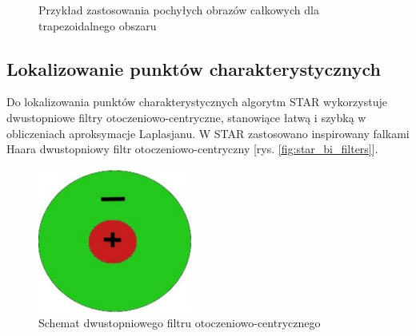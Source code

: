 \begin{figure}
\centering
{}
\caption{Przykład zastosowania pochyłych obrazów całkowych dla trapezoidalnego obszaru}
\label{fig:cs_trapezoidal}
\end{figure}







\subsection{Lokalizowanie punktów charakterystycznych}


Do lokalizowania punktów charakterystycznych algorytm STAR wykorzystuje dwustopniowe filtry otoczeniowo-centryczne, stanowiące łatwą i szybką w obliczeniach aproksymacje Laplasjanu. W STAR zastosowano inspirowany falkami Haara dwustopniowy filtr otoczeniowo-centryczny [rys. \ref{fig:star_bi_filters}].



\begin{figure}[!htb]
\centering
\includegraphics[scale=0.5]{pict/02/star/wg_haar.png}
\caption{Schemat dwustopniowego filtru otoczeniowo-centrycznego}
\label{fig:wg_haar}
\end{figure}

